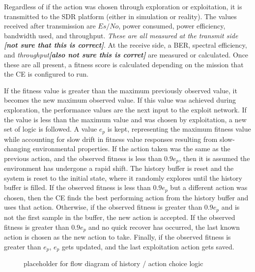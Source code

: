 \par Regardless of if the action was chosen through exploration or exploitation, it is transmitted to the SDR platform (either in simulation or reality). The values received after transmission are $Es/No$, power consumed, power efficiency, bandwidth used, and throughput. \textit{These are all measured at the transmit side \textbf{[not sure that this is correct]}}. At the receive side, a BER, spectral efficiency, and \textit{throughput\textbf{[also not sure this is corret]}} are measured or calculated. Once these are all present, a fitness score is calculated depending on the mission that the CE is configured to run. 
\par If the fitness value is greater than the maximum previously observed value, it becomes the new maximum observed value. If this value was achieved during exploration, the performance values are the next input to the exploit network. If the value is less than the maximum value and was chosen by exploitation, a new set of logic is followed. A value $e_p$ is kept, representing the maximum fitness value while accounting for slow drift in fitness value responses resulting from slow-changing environmental properties. If the action taken was the same as the previous action, and the observed fitness is less than $0.9 e_p$, then it is assumed the environment has undergone a rapid shift. The history buffer is reset and the system is reset to the initial state, where it randomly explores until the history buffer is filled.  If the observed fitness is less than $0.9 e_p$ but a different action was chosen, then the CE finds the best performing action from the history buffer and uses that action. Otherwise, if the observed fitness is greater than $0.9 e_p$ and is not the first sample in the buffer, the new action is accepted. If the observed fitness is greater than $0.9 e_p$ and no quick recover has occurred, the last known action is chosen as the new action to take. Finally, if the observed fitness is greater than $e_p$, $e_p$ gets updated, and the last exploitation action gets saved. 


\begin{figure}
\caption{placeholder for flow diagram of history / action choice logic}
\end{figure}

